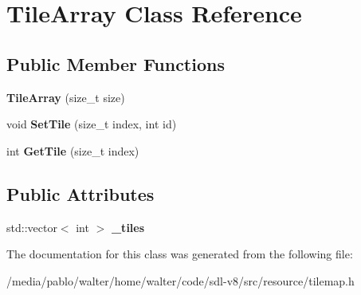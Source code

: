 \hypertarget{classTileArray}{}\section{Tile\+Array Class Reference}
\label{classTileArray}
\subsection*{Public Member Functions}
\begin{DoxyCompactItemize}
\item 
\mbox{\label{classTileArray_a4ab69b3efd60aaaf759751e961269ba4}} 
{\bfseries Tile\+Array} (size\+\_\+t size)
\item 
\mbox{\label{classTileArray_aae5261395fb9ea0040aae0cded239ba6}} 
void {\bfseries Set\+Tile} (size\+\_\+t index, int id)
\item 
\mbox{\label{classTileArray_a2661e7408f455cc6e0a7c2e34d29dba0}} 
int {\bfseries Get\+Tile} (size\+\_\+t index)
\end{DoxyCompactItemize}
\subsection*{Public Attributes}
\begin{DoxyCompactItemize}
\item 
\mbox{\label{classTileArray_a3c392b53e118291bc749a7c034688bf0}} 
std\+::vector$<$ int $>$ {\bfseries \+\_\+tiles}
\end{DoxyCompactItemize}


The documentation for this class was generated from the following file\+:\begin{DoxyCompactItemize}
\item 
/media/pablo/walter/home/walter/code/sdl-\/v8/src/resource/tilemap.\+h\end{DoxyCompactItemize}
